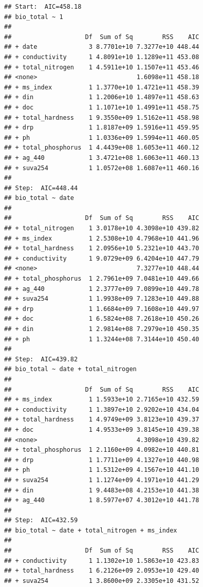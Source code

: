 \documentclass[
]{book}
\begin{document}
\begin{verbatim}
## Start:  AIC=458.18
## bio_total ~ 1
## 
##                    Df  Sum of Sq        RSS    AIC
## + date              3 8.7701e+10 7.3277e+10 448.44
## + conductivity      1 4.8091e+10 1.1289e+11 453.08
## + total_nitrogen    1 4.5911e+10 1.1507e+11 453.46
## <none>                           1.6098e+11 458.18
## + ms_index          1 1.3770e+10 1.4721e+11 458.39
## + din               1 1.2006e+10 1.4897e+11 458.63
## + doc               1 1.1071e+10 1.4991e+11 458.75
## + total_hardness    1 9.3550e+09 1.5162e+11 458.98
## + drp               1 1.8187e+09 1.5916e+11 459.95
## + ph                1 1.0336e+09 1.5994e+11 460.05
## + total_phosphorus  1 4.4439e+08 1.6053e+11 460.12
## + ag_440            1 3.4721e+08 1.6063e+11 460.13
## + suva254           1 1.0572e+08 1.6087e+11 460.16
## 
## Step:  AIC=448.44
## bio_total ~ date
## 
##                    Df  Sum of Sq        RSS    AIC
## + total_nitrogen    1 3.0178e+10 4.3098e+10 439.82
## + ms_index          1 2.5308e+10 4.7968e+10 441.96
## + total_hardness    1 2.0956e+10 5.2321e+10 443.70
## + conductivity      1 9.0729e+09 6.4204e+10 447.79
## <none>                           7.3277e+10 448.44
## + total_phosphorus  1 2.7961e+09 7.0481e+10 449.66
## + ag_440            1 2.3777e+09 7.0899e+10 449.78
## + suva254           1 1.9938e+09 7.1283e+10 449.88
## + drp               1 1.6684e+09 7.1608e+10 449.97
## + doc               1 6.5824e+08 7.2618e+10 450.26
## + din               1 2.9814e+08 7.2979e+10 450.35
## + ph                1 1.3244e+08 7.3144e+10 450.40
## 
## Step:  AIC=439.82
## bio_total ~ date + total_nitrogen
## 
##                    Df  Sum of Sq        RSS    AIC
## + ms_index          1 1.5933e+10 2.7165e+10 432.59
## + conductivity      1 1.3897e+10 2.9202e+10 434.04
## + total_hardness    1 4.9749e+09 3.8123e+10 439.37
## + doc               1 4.9533e+09 3.8145e+10 439.38
## <none>                           4.3098e+10 439.82
## + total_phosphorus  1 2.1160e+09 4.0982e+10 440.81
## + drp               1 1.7711e+09 4.1327e+10 440.98
## + ph                1 1.5312e+09 4.1567e+10 441.10
## + suva254           1 1.1274e+09 4.1971e+10 441.29
## + din               1 9.4483e+08 4.2153e+10 441.38
## + ag_440            1 8.5977e+07 4.3012e+10 441.78
## 
## Step:  AIC=432.59
## bio_total ~ date + total_nitrogen + ms_index
## 
##                    Df  Sum of Sq        RSS    AIC
## + conductivity      1 1.1302e+10 1.5863e+10 423.83
## + total_hardness    1 6.2126e+09 2.0953e+10 429.40
## + suva254           1 3.8600e+09 2.3305e+10 431.52

\end{verbatim}
\end{document}
